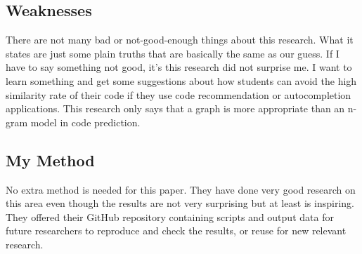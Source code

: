 \documentclass[runningheads]{llncs}
\begin{document}
\subsection{Weaknesses}
There are not many bad or not-good-enough things about this research. What it states are just some plain truths that are basically the same as our guess. If I have to say something not good, it’s this research did not surprise me. I want to learn something and get some suggestions about how students can avoid the high similarity rate of their code if they use code recommendation or autocompletion applications. This research only says that a graph is more appropriate than an n-gram model in code prediction.

\subsection{My Method}
No extra method is needed for this paper. They have done very good research on this area even though the results are not very surprising but at least is inspiring. They offered their GitHub repository containing scripts and output data for future researchers to reproduce and check the results, or reuse for new relevant research.
\end{document}

